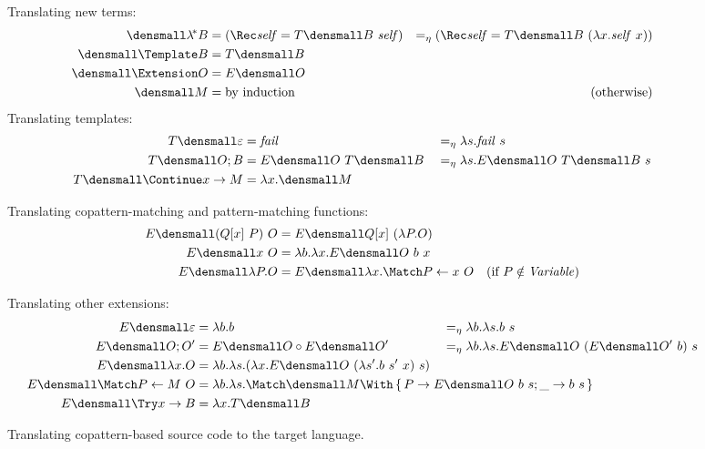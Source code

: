 \begin{figure}[t]
\centering
\small
Translating new terms:  
\begin{align*}
  \den{\lamstar B}
  &=
  (\Rec \mathit{self} = T\den{B} ~ \mathit{self})
  &=_\eta
  (\Rec \mathit{self} = T\den{B} ~ (\lambda x. \mathit{self} ~ x))
  \\
  \den{\Template B}
  &=
  T\den{B}
  \\
  \den{\Extension O}
  &=
  E\den{O}
  \\
  \den{M}
  &=
  \text{by induction}
  &(\text{otherwise})
\end{align*}
Translating templates:
\begin{align*}
  T\den{\varepsilon}
  &=
  \mathit{fail}
  &
  &=_\eta
  \lambda s. \mathit{fail}~s
  \\
  T\den{O; B}
  &=
  E\den{O} ~ T\den{B}
  &
  &=_\eta
  \lambda s. E\den{O} ~ T\den{B} ~ s
  \\
  T\den{\Continue x \to M}
  &=
  \lambda x. \den{M}
\end{align*}

Translating copattern-matching and pattern-matching functions:
\begin{align*}
  E\den{(Q[x] ~ P) ~ O}
  &=
  E\den{Q[x] ~ (\lambda P. O)}
  \\
  E\den{x ~ O}
  &=
  \lambda b. \lambda x. E\den{O} ~ b ~ x
  \\
  E\den{\lambda P. O}
  &=
  E\den{\lambda x. \Match P \gets x ~ O}
  &(\text{if } P \notin \mathit{Variable})
\end{align*}

Translating other extensions:
\begin{align*}
  E\den{\varepsilon}
  &=
  \lambda b. b
  &
  &=_\eta
  \lambda b. \lambda s. b ~ s
  \\
  E\den{O; O'}
  &=
  E\den{O} \comp E\den{O'}
  &
  &=_\eta
  \lambda b. \lambda s. E\den{O} ~ (E\den{O'}~b) ~ s
  \\
  E\den{\lambda x. O}
  &=
  \lambda b. \lambda s. (\lambda x. E\den{O} ~ (\lambda s'. b ~ s' ~ x) ~ s)
  \\
  E\den{\Match P \gets M ~ O}
  &=
  \rlap{$
    \lambda b. \lambda s.
    \Match \den{M} \With \set{P \to E\den{O}~b~s; \_ \to b~s}
  $}
  \\
  E\den{\Try x \to B}
  &=
  \lambda x. T\den{B}
\end{align*}
\caption{Translating copattern-based source code to the target language.}
\label{fig:translation}
\end{figure}

